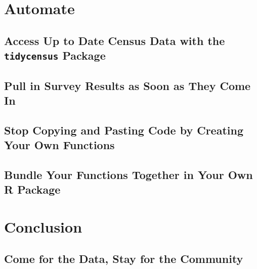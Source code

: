 \documentclass[
]{book}
\begin{document}
\hypertarget{part-automate}{%
\part*{Automate}\label{part-automate}}

\hypertarget{access-up-to-date-census-data-with-the-tidycensus-package}{%
\chapter*{\texorpdfstring{Access Up to Date Census Data with the \texttt{tidycensus} Package}{Access Up to Date Census Data with the tidycensus Package}}\label{access-up-to-date-census-data-with-the-tidycensus-package}}

\hypertarget{pull-in-survey-results-as-soon-as-they-come-in}{%
\chapter*{Pull in Survey Results as Soon as They Come In}\label{pull-in-survey-results-as-soon-as-they-come-in}}

\hypertarget{stop-copying-and-pasting-code-by-creating-your-own-functions}{%
\chapter*{Stop Copying and Pasting Code by Creating Your Own Functions}\label{stop-copying-and-pasting-code-by-creating-your-own-functions}}

\hypertarget{bundle-your-functions-together-in-your-own-r-package}{%
\chapter*{Bundle Your Functions Together in Your Own R Package}\label{bundle-your-functions-together-in-your-own-r-package}}

\hypertarget{part-conclusion}{%
\part*{Conclusion}\label{part-conclusion}}

\hypertarget{come-for-the-data-stay-for-the-community}{%
\chapter*{Come for the Data, Stay for the Community}\label{come-for-the-data-stay-for-the-community}}
\end{document}
